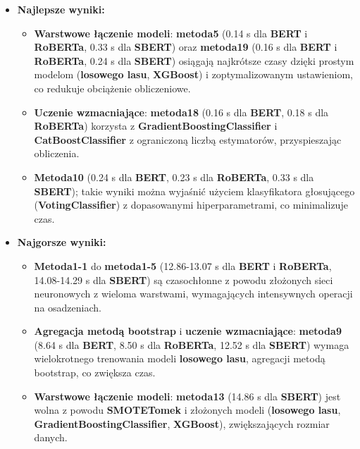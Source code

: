 \begin{itemize}
	\item \textbf{Najlepsze wyniki:}
	      \begin{itemize}
		      \item \textbf{Warstwowe łączenie modeli}: \textbf{metoda5} (0.14 s dla \textbf{BERT} i \textbf{RoBERTa}, 0.33 s dla \textbf{SBERT}) oraz \textbf{metoda19} (0.16 s dla \textbf{BERT} i \textbf{RoBERTa}, 0.24 s dla \textbf{SBERT}) osiągają najkrótsze czasy dzięki prostym modelom (\textbf{losowego lasu}, \textbf{XGBoost}) i zoptymalizowanym ustawieniom, co redukuje obciążenie obliczeniowe.
		      \item \textbf{Uczenie wzmacniające}: \textbf{metoda18} (0.16 s dla \textbf{BERT}, 0.18 s dla \textbf{RoBERTa}) korzysta z \textbf{GradientBoostingClassifier} i \textbf{CatBoostClassifier} z ograniczoną liczbą estymatorów, przyspieszając obliczenia.
		      \item \textbf{Metoda10} (0.24 s dla \textbf{BERT}, 0.23 s dla \textbf{RoBERTa}, 0.33 s dla \textbf{SBERT}); takie wyniki można wyjaśnić użyciem klasyfikatora głosującego (\textbf{VotingClassifier}) z dopasowanymi hiperparametrami, co minimalizuje czas.
	      \end{itemize}
	\item \textbf{Najgorsze wyniki:}
	      \begin{itemize}
		      \item \textbf{Metoda1-1} do \textbf{metoda1-5} (12.86-13.07 s dla \textbf{BERT} i \textbf{RoBERTa}, 14.08-14.29 s dla \textbf{SBERT}) są czasochłonne z powodu złożonych sieci neuronowych z wieloma warstwami, wymagających intensywnych operacji na osadzeniach.
		      \item \textbf{Agregacja metodą bootstrap} i \textbf{uczenie wzmacniające}: \textbf{metoda9} (8.64 s dla \textbf{BERT}, 8.50 s dla \textbf{RoBERTa}, 12.52 s dla \textbf{SBERT}) wymaga wielokrotnego trenowania modeli \textbf{losowego lasu}, agregacji metodą bootstrap, co zwiększa czas.
		      \item \textbf{Warstwowe łączenie modeli}: \textbf{metoda13} (14.86 s dla \textbf{SBERT}) jest wolna z powodu \textbf{SMOTETomek} i złożonych modeli (\textbf{losowego lasu}, \textbf{GradientBoostingClassifier}, \textbf{XGBoost}), zwiększających rozmiar danych.
	      \end{itemize}
\end{itemize}

